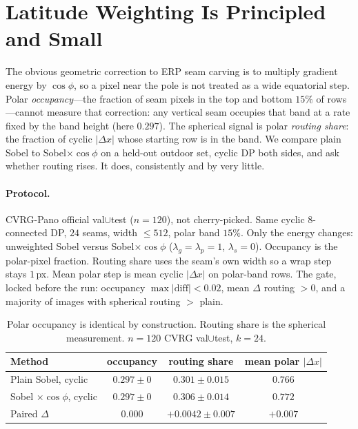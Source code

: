 
\section{Latitude Weighting Is Principled and Small}
\label{sec:spherical}

The obvious geometric correction to ERP seam carving is to multiply
gradient energy by $\cos\phi$, so a pixel near the pole is not treated
as a wide equatorial step. Polar \emph{occupancy}---the fraction of
seam pixels in the top and bottom $15\%$ of rows---cannot measure that
correction: any vertical seam occupies that band at a rate fixed by the
band height (here $0.297$). The spherical signal is polar
\emph{routing share}: the fraction of cyclic $|\Delta x|$ whose starting
row is in the band. We compare plain Sobel to Sobel$\times\cos\phi$ on a
held-out outdoor set, cyclic DP both sides, and ask whether routing
rises. It does, consistently and by very little.

\paragraph{Protocol.}
CVRG-Pano official val$\cup$test ($n=120$), not cherry-picked. Same
cyclic $8$-connected DP, $24$ seams, width $\le 512$, polar band $15\%$.
Only the energy changes: unweighted Sobel versus Sobel$\times\cos\phi$
($\lambda_g=\lambda_p=1$, $\lambda_s=0$). Occupancy is the polar-pixel
fraction. Routing share uses the seam's own width so a wrap step stays
$1$\,px. Mean polar step is mean cyclic $|\Delta x|$ on polar-band rows.
The gate, locked before the run: occupancy $\max|\mathrm{diff}|<0.02$,
mean $\Delta$ routing $>0$, and a majority of images with spherical
routing $>$ plain.

\begin{table}[t]
\centering
\caption{Polar occupancy is identical by construction. Routing share is
the spherical measurement. $n=120$ CVRG val$\cup$test, $k=24$.}
\label{tab:spherical}
\begin{tabular}{lccc}
\toprule
Method & occupancy & routing share & mean polar $|\Delta x|$ \\
\midrule
Plain Sobel, cyclic & $0.297\pm 0$ & $0.301\pm 0.015$ & $0.766$ \\
Sobel $\times\cos\phi$, cyclic & $0.297\pm 0$ & $0.306\pm 0.014$ & $0.772$ \\
Paired $\Delta$ & $0.000$ & $+0.0042\pm 0.007$ & $+0.007$ \\
\bottomrule
\end{tabular}
\end{table}

